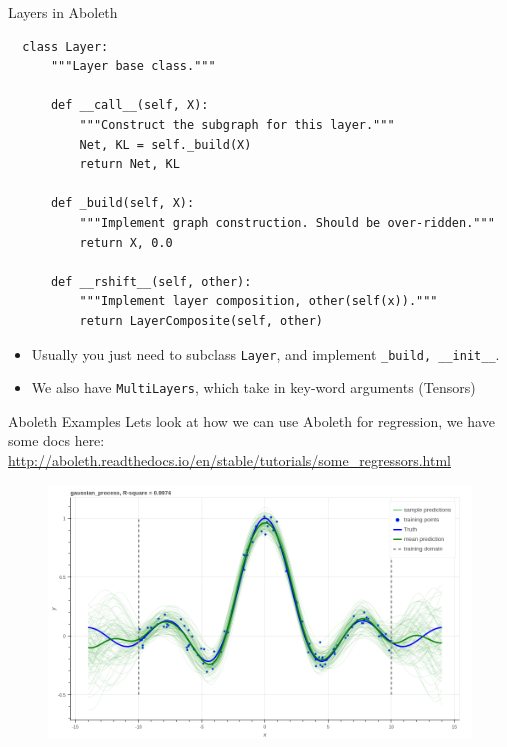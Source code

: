 \documentclass[lualatex, aspectratio=169]{beamer}
\begin{document}
\begin{frame}[fragile]{Layers in Aboleth}

  \begin{verbatim}
  class Layer:
      """Layer base class."""

      def __call__(self, X):
          """Construct the subgraph for this layer."""
          Net, KL = self._build(X)
          return Net, KL

      def _build(self, X):
          """Implement graph construction. Should be over-ridden."""
          return X, 0.0

      def __rshift__(self, other):
          """Implement layer composition, other(self(x))."""
          return LayerComposite(self, other)

  \end{verbatim}

  \begin{itemize}
    \item Usually you just need to subclass \texttt{Layer}, and implement \texttt{\_build, \_\_init\_\_}.
    \item We also have \texttt{MultiLayers}, which take in key-word arguments (Tensors)
  \end{itemize}
\end{frame}


\begin{frame}{Aboleth Examples}
  Lets look at how we can use Aboleth for regression, we have some docs here:
  \url{http://aboleth.readthedocs.io/en/stable/tutorials/some_regressors.html}

  \begin{figure}
    \includegraphics[width=0.6\pagewidth]{assets/gpr.png}
  \end{figure}

\end{frame}
\end{document}
